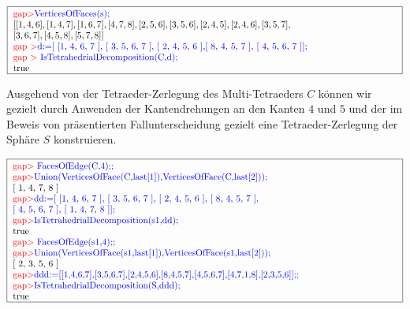 \documentclass[12pt,titlepage,twoside,cleardoublepage]{article}
\theoremstyle{nummermitklammern}
\numberwithin{equation}{section}
\begin{document}
\begin{center}
 $\fbox{
\parbox{15cm}{
\textcolor{red}{gap$>$}\textcolor{blue}{ VerticesOfFaces(s);}\newline 
$[ [ 1, 4, 6 ], [ 1, 4, 7 ], [ 1, 6, 7 ], [ 4, 7, 8 ], [ 2, 5, 6 ],
[ 3, 5, 6 ],[ 2, 4, 5 ], [ 2, 4, 6 ], [ 3, 5, 7 ],$ \newline
$  [ 3, 6, 7 ],
[ 4, 5, 8 ], [ 5, 7, 8 ] ]$\newline
\textcolor{red}{gap $>$}\textcolor{blue}{d:=[ [1, 4, 6, 7 ], [ 3, 5, 6, 7 ], [ 2, 4, 5, 6 ],[ 8, 4, 5, 7 ], [ 4, 5, 6, 7 ]];}\newline
\textcolor{red}{gap $>$} \textcolor{blue}{IsTetrahedrialDecomposition(C,d);}\newline
true
 }}$
 \end{center}
 Ausgehend von der Tetraeder-Zerlegung des Multi-Tetraeders $C$ können wir gezielt durch Anwenden der Kantendrehungen an den Kanten $4$ und $5$ und der im Beweis von  präsentierten Fallunterscheidung gezielt eine Tetraeder-Zerlegung der Sphäre $S$ konstruieren.
 \begin{center}
 $\fbox{
\parbox{15cm}{
\textcolor{red}{gap$>$} \textcolor{blue}{FacesOfEdge(C,4);;}\newline 
\textcolor{red}{gap$>$}\textcolor{blue}{Union(VerticesOfFace(C,last[1]),VerticesOfFace(C,last[2]));}
\newline
 [ 1, 4, 7, 8 ]\newline 
\textcolor{red}{gap$>$}\textcolor{blue}{dd:=[ [1, 4, 6, 7 ], [ 3, 5, 6, 7 ], [ 2, 4, 5, 6 ], [ 8, 4, 5, 7 ],$ \newline $ [ 4, 5, 6, 7 ], [ 1,
4, 7, 8 ]];}\newline 
\textcolor{red}{gap$>$}\textcolor{blue}{ IsTetrahedrialDecomposition(s1,dd);}\newline 
true\newline 
\textcolor{red}{gap$>$} \textcolor{blue}{FacesOfEdge(s1,4);;}\newline 
\textcolor{red}{gap$>$}\textcolor{blue}{Union(VerticesOfFace(s1,last[1]),VerticesOfFace(s1,last[2]));}
\newline [ 2, 3, 5, 6 ]\newline 
\textcolor{red}{gap$>$}\textcolor{blue}{ddd:=[[1,4,6,7],[3,5,6,7],[2,4,5,6],[8,4,5,7],[4,5,6,7],[4,7,1,8],[2,3,5,6]];;}\newline 
\textcolor{red}{gap$>$}\textcolor{blue}{IsTetrahedrialDecomposition(S,ddd);}\newline 
true
 }}$
 \end{center}
\end{document}
